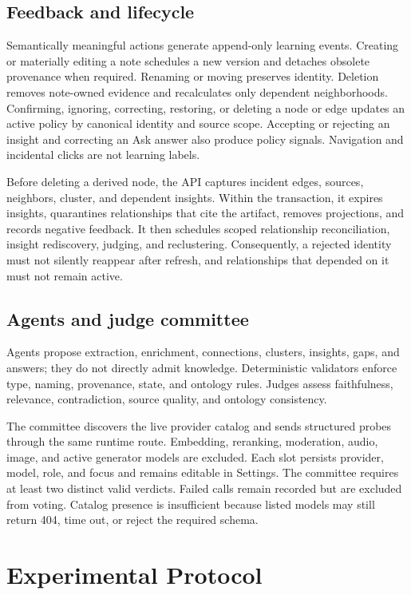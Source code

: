\documentclass{sbc2023}
\begin{document}
\subsection{Feedback and lifecycle}

Semantically meaningful actions generate append-only learning events. Creating or materially
editing a note schedules a new version and detaches obsolete provenance when required. Renaming or
moving preserves identity. Deletion removes note-owned evidence and recalculates only dependent
neighborhoods. Confirming, ignoring, correcting, restoring, or deleting a node or edge updates an
active policy by canonical identity and source scope. Accepting or rejecting an insight and
correcting an Ask answer also produce policy signals. Navigation and incidental clicks are not
learning labels.

Before deleting a derived node, the API captures incident edges, sources, neighbors, cluster, and
dependent insights. Within the transaction, it expires insights, quarantines relationships that
cite the artifact, removes projections, and records negative feedback. It then schedules scoped
relationship reconciliation, insight rediscovery, judging, and reclustering. Consequently, a
rejected identity must not silently reappear after refresh, and relationships that depended on it
must not remain active.

\subsection{Agents and judge committee}

Agents propose extraction, enrichment, connections, clusters, insights, gaps, and answers; they do
not directly admit knowledge. Deterministic validators enforce type, naming, provenance, state,
and ontology rules. Judges assess faithfulness, relevance, contradiction, source quality, and
ontology consistency.

The committee discovers the live provider catalog and sends structured probes through the same
runtime route. Embedding, reranking, moderation, audio, image, and active generator models are
excluded. Each slot persists provider, model, role, and focus and remains editable in Settings.
The committee requires at least two distinct valid verdicts. Failed calls remain recorded but are
excluded from voting. Catalog presence is insufficient because listed models may still return
404, time out, or reject the required schema.

\section{Experimental Protocol}
\label{sec:protocol}
\end{document}
